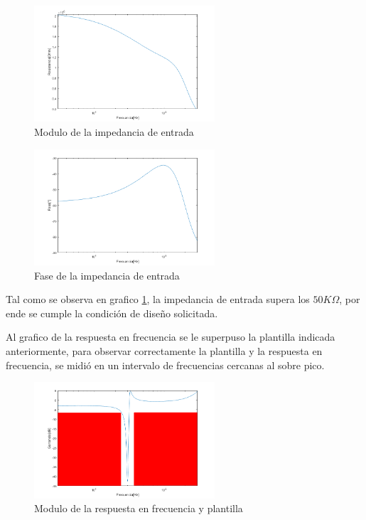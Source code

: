 \documentclass[../../tc_tp5_main.tex]{subfiles}
\begin{document}
\begin{figure}[H]	
	\centering
	\includegraphics[width=0.6\textwidth]{imagenes/zinMag.png} 
	\caption{Modulo de la impedancia de entrada}\label{fig:zinmagg}
\end{figure}


\begin{figure}[H]	
	\centering
	\includegraphics[width=0.6\textwidth]{imagenes/zinFase.png}
	\caption{Fase de la impedancia de entrada}
\end{figure}
Tal como se observa en grafico \ref{fig:zinmagg}, la impedancia de entrada supera los $50K\Omega$, por ende se cumple la condición de diseño solicitada.

Al grafico de la respuesta en frecuencia se le superpuso la plantilla indicada anteriormente, para observar correctamente la plantilla y la respuesta en frecuencia, se midió en un intervalo de frecuencias cercanas al sobre pico.

\begin{figure}[H]	
	\centering
	\includegraphics[width=0.6\textwidth]{imagenes/magplant.png}
	\caption{Modulo de la respuesta en frecuencia y plantilla}
\end{figure}
\end{document}
